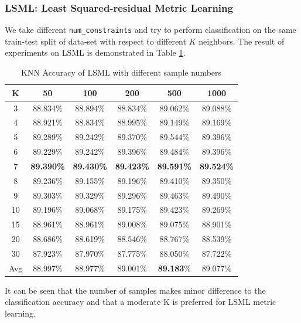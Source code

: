 \subsubsection{LSML: Least Squared-residual Metric Learning}

We take different \texttt{num\_constraints} and try to perform classification on the same train-test split of data-set with respect to different $K$ neighbors. The result of experiments on LSML is demonstrated in Table \ref{tab:lsml}.

\begin{table}[h]
\centering
\caption{KNN Accuracy of LSML with different sample numbers \label{tab:lsml}}
\begin{tabular}{cccccc}
\hline
K   & 50       & 100      & 200      & 500      & 1000     \\ \hline
3   & 88.834\% & 88.894\% & 88.834\% & 89.062\% & 89.088\% \\
4   & 88.921\% & 88.834\% & 88.995\% & 89.149\% & 89.169\% \\
5   & 89.289\% & 89.242\% & 89.370\% & 89.544\% & 89.396\% \\
6   & 89.229\% & 89.242\% & 89.396\% & 89.484\% & 89.396\% \\
7   & \textbf{89.390\%} & \textbf{89.430\%} & \textbf{89.423\%} & \textbf{89.591\%} & \textbf{89.524\%} \\
8   & 89.236\% & 89.155\% & 89.196\% & 89.410\% & 89.350\% \\
9   & 89.303\% & 89.329\% & 89.296\% & 89.463\% & 89.490\% \\
10  & 89.196\% & 89.068\% & 89.175\% & 89.423\% & 89.269\% \\
15  & 88.961\% & 88.961\% & 89.008\% & 89.075\% & 88.901\% \\
20  & 88.686\% & 88.619\% & 88.546\% & 88.767\% & 88.539\% \\
30  & 87.923\% & 87.970\% & 87.775\% & 88.050\% & 87.722\% \\ \hline
Avg & 88.997\% & 88.977\% & 89.001\% & \textbf{89.183}\% & 89.077\% \\ \hline
\end{tabular}
\end{table}

It can be seen that the number of samples makes minor difference to the classification accuracy and that a moderate K is preferred for LSML metric learning.


